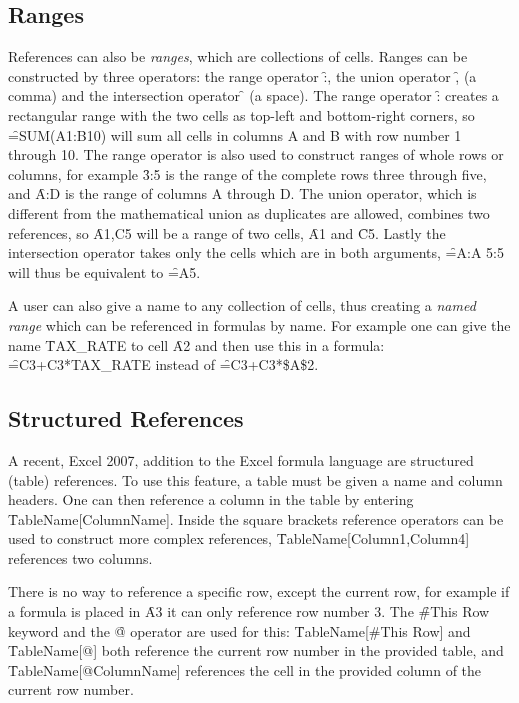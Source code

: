 \subsection{Ranges}
References can also be \emph{ranges}, which are collections of cells.
Ranges can be constructed by three operators: the range operator \f{:}, the union operator \f{,} (a comma) and the intersection operator \f{} (a space).
The range operator \f{:} creates a rectangular range with the two cells as top-left and bottom-right corners, so \f{=SUM(A1:B10)} will sum all cells in columns A and B with row number 1 through 10.
The range operator is also used to construct ranges of whole rows or columns, for example \f{3:5} is the range of the complete rows three through five, and \f{A:D} is the range of columns A through D.
The union operator, which is different from the mathematical union as duplicates are allowed, combines two references, so \f{A1,C5} will be a range of two cells, \f{A1} and \f{C5}.
Lastly the intersection operator takes only the cells which are in both arguments, \f{=A:A 5:5} will thus be equivalent to \f{=A5}.

A user can also give a name to any collection of cells, thus creating a \emph{named range} which can be referenced in formulas by name.
For example one can give the name \f{TAX\_RATE} to cell \f{A2} and then use this in a formula: \f{=C3+C3*TAX\_RATE} instead of \f{=C3+C3*\$A\$2}.

\subsection{Structured References}

A recent, Excel 2007, addition to the Excel formula language are structured (table) references.
To use this feature, a table must be given a name and column headers.
One can then reference a column in the table by entering \f{TableName[ColumnName]}.
Inside the square brackets reference operators can be used to construct more complex references, \f{TableName[Column1,Column4]} references two columns.

There is no way to reference a specific row, except the current row, for example if a formula is placed in \f{A3} it can only reference row number 3.
The \f{\#This Row} keyword and the \f{@} operator are used for this: \f{TableName[\#This Row]} and \f{TableName[@]} both reference the current row number in the provided table, and \f{TableName[@ColumnName]} references the cell in the provided column of the current row number.


